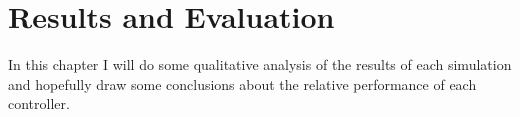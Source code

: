 \chapter{Results and Evaluation}
\label{ch:evaluation}


In this chapter I will do some qualitative analysis of the results of each simulation and hopefully draw some conclusions about the relative performance of each controller.
